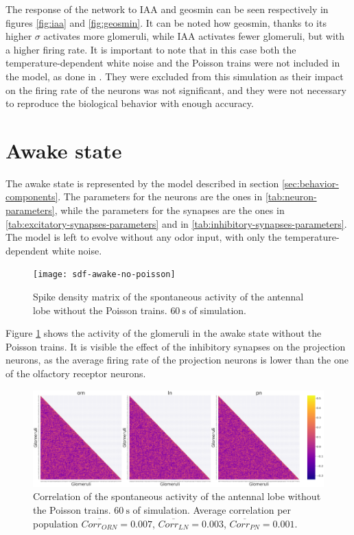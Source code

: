 The response of the network to IAA and geosmin can be seen respectively in figures \ref{fig:iaa} and \ref{fig:geosmin}.
It can be noted how geosmin, thanks to its higher $\sigma$ activates more glomeruli, while IAA activates fewer glomeruli, but with a higher firing rate.
It is important to note that in this case both the temperature-dependent white noise and the Poisson trains were not included in the model, as done in \cite{bee-geosmin}.
They were excluded from this simulation as their impact on the firing rate of the neurons was not significant, and they were not necessary to reproduce the biological behavior with enough accuracy.

\section{Awake state}
The awake state is represented by the model described in section \ref{sec:behavior-components}.
The parameters for the neurons are the ones in \ref{tab:neuron-parameters}, while the parameters for the synapses are the ones in \ref{tab:excitatory-synapses-parameters} and in \ref{tab:inhibitory-synapses-parameters}.
The model is left to evolve without any odor input, with only the temperature-dependent white noise.

\begin{figure}
  \centering
  \texttt{[image: sdf-awake-no-poisson]}
  \caption{Spike density matrix of the spontaneous activity of the antennal lobe without the Poisson trains. $\SI{60}{\second}$ of simulation.}
  \label{fig:sdf-awake-no-poisson}
\end{figure}

Figure \ref{fig:sdf-awake-no-poisson} shows the activity of the glomeruli in the awake state without the Poisson trains.
It is visible the effect of the inhibitory synapses on the projection neurons, as the average firing rate of the projection neurons is lower than the one of the olfactory receptor neurons.

\begin{figure}
  \centering
  \includegraphics[width=\textwidth]{correlation-awake-no-poisson}
  \caption{Correlation of the spontaneous activity of the antennal lobe without the Poisson trains. $\SI{60}{\second}$ of simulation. Average correlation per population $\overline{Corr_{ORN}} = 0.007$, $\overline{Corr_{LN}} = 0.003$, $\overline{Corr_{PN}} = 0.001$.}
  \label{fig:correlation-awake-no-poisson}
\end{figure}

